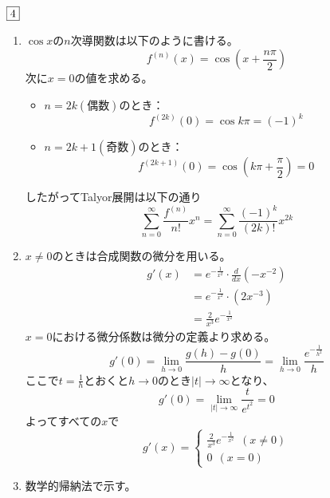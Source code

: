 \documentclass[dvipdfmx]{jsreport}
\newcounter{num}[section]
\begin{document}
\begin{answer} %
	$\fbox{4}$
\begin{enumerate}
	\item $\cos{x}$の$n$次導関数は以下のように書ける。
\begin{equation*}
	f^{(n)}(x)= \cos{\left(x+ \frac{n\pi}{2}\right)}
\end{equation*}
	次に$x= 0$の値を求める。
\begin{itemize}
	\item $n= 2k(偶数)$のとき：
\begin{equation*}
	f^{(2k)}(0)= \cos{k\pi}= (-1)^k
\end{equation*}
 
	\item $n= 2k+ 1(奇数)$のとき：
\begin{equation*}
	f^{(2k+ 1)}(0)= \cos{\left(k\pi+ \frac{\pi}{2}\right)}= 0
\end{equation*}
\end{itemize}
	したがってTalyor展開は以下の通り
\begin{equation*}
	\sum_{n= 0}^\infty \frac{f^{(n)}}{n!}x^n= \sum_{n= 0}^\infty \frac{(-1)^k}{(2k)!}x^{2k}
\end{equation*}

	\item $x\ne 0$のときは合成関数の微分を用いる。
\begin{align*}
	g'(x)
	&= e^{-\frac{1}{x^2}}\cdot \frac{d}{dx}(-x^{-2})\\
	&= e^{-\frac{1}{x^2}}\cdot (2x^{-3})\\
	&= \frac{2}{x^3}e^{-\frac{1}{x^2}}
\end{align*}
	$x= 0$における微分係数は微分の定義より求める。
\begin{equation*}
	g'(0)= \lim_{h\to 0}\frac{g(h)- g(0)}{h}= \lim_{h\to 0} \frac{e^{-\frac{1}{h^2}}}{h}
\end{equation*}
	ここで$t= \frac{1}{h}$とおくと$h\to 0$のとき$|t|\to \infty$となり、
\begin{equation*}
	g'(0)= \lim_{|t|\to \infty} \frac{t}{e^{t^2}}= 0
\end{equation*}
	よってすべての$x$で
\begin{equation*}
	g'(x)= 
\begin{cases}
	\frac{2}{x^3}e^{-\frac{1}{x^2}}\ \ (x\ne 0)\\
0\ \ (x= 0)
\end{cases}
\end{equation*}
	\item\label{step:R7-2nd数学的帰納法} 数学的帰納法で示す。
\end{enumerate}
\end{answer}
\end{document}
